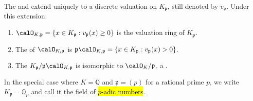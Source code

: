 \begin{definition}
    The  and  extend uniquely to a discrete valuation on $K_\mathfrak{p}$, still denoted by $v_\mathfrak{p}$. Under this extension:
    \begin{enumerate}
        \item $\calO_{K,\mathfrak{p}} = \{x \in K_\mathfrak{p} : v_\mathfrak{p}(x) \geq 0\}$ is the valuation ring of $K_\mathfrak{p}$.
        \item The  of $\calO_{K,\mathfrak{p}}$ is $\mathfrak{p}\calO_{K,\mathfrak{p}} = \{x \in K_\mathfrak{p} : v_\mathfrak{p}(x) > 0\}$.
        \item The  $K_\mathfrak{p}/\mathfrak{p}\calO_{K,\mathfrak{p}}$ is isomorphic to $\calO_K/\mathfrak{p}$, a .
    \end{enumerate}

    In the special case where $K = \mathbb{Q}$ and $\mathfrak{p} = (p)$ for a rational prime $p$, we write $K_\mathfrak{p} = \mathbb{Q}_p$ and call it the field of \hl{$p$-adic numbers}.
\end{definition}
